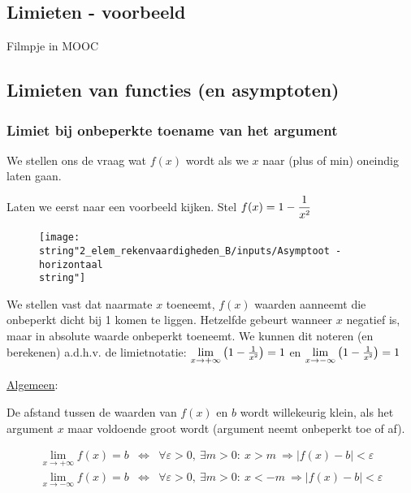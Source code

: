 \subsection{Limieten - voorbeeld}

Filmpje in MOOC

\subsection{Limieten van functies (en asymptoten)}


\subsubsection{Limiet bij onbeperkte toename van het argument}

We stellen ons de vraag wat $f(x)$ wordt als we $x$ naar (plus of
min) oneindig laten gaan.

\medskip{}


\noindent Laten we eerst naar een voorbeeld kijken. Stel $f(x)={\displaystyle 1-\frac{1}{x\text{\texttwosuperior}}}$

\begin{figure}[h]
\centering{}\texttt{[image: \\string"2\_elem\_rekenvaardigheden\_B/inputs/Asymptoot - horizontaal\\string"]} 
\end{figure}


\noindent We stellen vast dat naarmate $x$ toeneemt, $f(x)$ waarden
aanneemt die onbeperkt dicht bij 1 komen te liggen. Hetzelfde gebeurt
wanneer $x$ negatief is, maar in absolute waarde onbeperkt toeneemt.
We kunnen dit noteren (en berekenen) a.d.h.v. de limietnotatie: ${\displaystyle \lim_{x\to+\infty}}\left(1-\frac{1}{x\text{\texttwosuperior}}\right)=1$
en ${\displaystyle \lim_{x\to-\infty}}\left(1-\frac{1}{x\text{\texttwosuperior}}\right)=1$

\medskip{}


\noindent \uline{Algemeen}:

De afstand tussen de waarden van $f(x)$ en $b$ wordt willekeurig
klein, als het argument $x$ maar voldoende groot wordt (argument
neemt onbeperkt toe of af).\medskip{}


\begin{eqnarray*}
{\displaystyle \lim_{x\to+\infty}}f(x)=b & \Leftrightarrow & \forall\varepsilon>0,\:\exists m>0:\:x>m\:\Rightarrow\left|f(x)-b\right|<\varepsilon\\
{\displaystyle \lim_{x\to-\infty}}f(x)=b & \Leftrightarrow & \forall\varepsilon>0,\:\exists m>0:\:x<-m\:\Rightarrow\left|f(x)-b\right|<\varepsilon
\end{eqnarray*}

